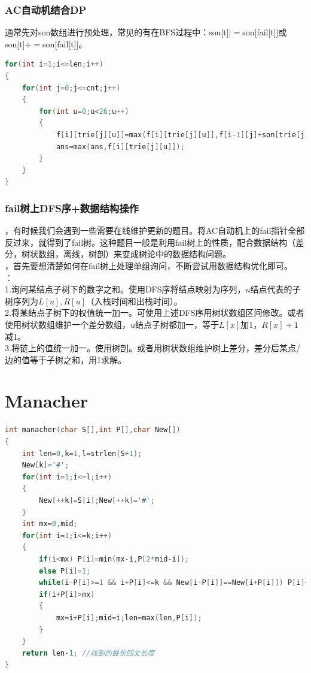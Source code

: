 \documentclass[a4paper]{book}
\begin{document}
\subsubsection{AC自动机结合DP}
通常先对son数组进行预处理，常见的有在BFS过程中：son[t]$\mid=$son[fail[t]]或son[t]$+=$son[fail[t]]。
\begin{lstlisting}[language=c++]
for(int i=1;i<=len;i++)
{
    for(int j=0;j<=cnt;j++)
    {
        for(int u=0;u<26;u++)
        {
            f[i][trie[j][u]]=max(f[i][trie[j][u]],f[i-1][j]+son[trie[j][u]]);
            ans=max(ans,f[i][trie[j][u]]);
        }
    }
}
\end{lstlisting}
\subsubsection{fail树上DFS序+数据结构操作}
，有时候我们会遇到一些需要在线维护更新的题目。将AC自动机上的fail指针全部反过来，就得到了fail树。这种题目一般是利用fail树上的性质，配合数据结构（差分，树状数组，离线，树剖）来变成树论中的数据结构问题。\\
，首先要想清楚如何在fail树上处理单组询问，不断尝试用数据结构优化即可。\\
：\\
\indent1.询问某结点子树下的数字之和。使用DFS序将结点映射为序列，$u$结点代表的子树序列为$L[u],R[u]$（入栈时间和出栈时间）。\\
\indent2.将某结点子树下的权值统一加一。可使用上述DFS序用树状数组区间修改。或者使用树状数组维护一个差分数组，$u$结点子树都加一，等于$L[x]$加$1$，$R[x]+1$减$1$。\\
\indent3.将链上的值统一加一。使用树剖。或者用树状数组维护树上差分，差分后某点/边的值等于子树之和，用1求解。
\section{Manacher}
\begin{lstlisting}[language=c++]
int manacher(char S[],int P[],char New[])
{
    int len=0,k=1,l=strlen(S+1);
    New[k]='#';
    for(int i=1;i<=l;i++)
    {
        New[++k]=S[i];New[++k]='#';
    }
    int mx=0,mid;
    for(int i=1;i<=k;i++)
    {
        if(i<mx) P[i]=min(mx-i,P[2*mid-i]);
        else P[i]=1;
        while(i-P[i]>=1 && i+P[i]<=k && New[i-P[i]]==New[i+P[i]]) P[i]++;
        if(i+P[i]>mx)
        {
            mx=i+P[i];mid=i;len=max(len,P[i]);
        }
    }
    return len-1; //找到的最长回文长度
}
\end{lstlisting}
\end{document}
